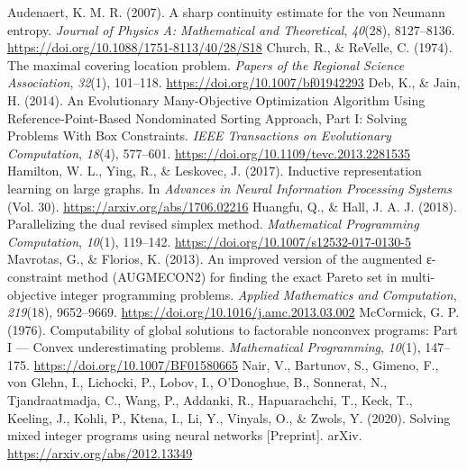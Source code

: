 \documentclass[10pt]{article}
\begin{document}
\begin{thebibliography}{}
\setlength{\itemsep}{1pt}
Audenaert, K. M. R. (2007). A sharp continuity estimate for the von Neumann entropy. {\itshape Journal of Physics A: Mathematical and Theoretical}, {\itshape 40}(28), 8127–8136. \url{https://doi.org/10.1088/1751-8113/40/28/S18}
Church, R., \& ReVelle, C. (1974). The maximal covering location problem. {\itshape Papers of the Regional Science Association}, {\itshape 32}(1), 101–118. \url{https://doi.org/10.1007/bf01942293}
Deb, K., \& Jain, H. (2014). An Evolutionary Many-Objective Optimization Algorithm Using Reference-Point-Based Nondominated Sorting Approach, Part I: Solving Problems With Box Constraints. {\itshape IEEE Transactions on Evolutionary Computation}, {\itshape 18}(4), 577–601. \url{https://doi.org/10.1109/tevc.2013.2281535}
Hamilton, W. L., Ying, R., \& Leskovec, J. (2017). Inductive representation learning on large graphs. In {\itshape Advances in Neural Information Processing Systems} (Vol. 30). \url{https://arxiv.org/abs/1706.02216}
Huangfu, Q., \& Hall, J. A. J. (2018). Parallelizing the dual revised simplex method. {\itshape Mathematical Programming Computation}, {\itshape 10}(1), 119–142. \url{https://doi.org/10.1007/s12532-017-0130-5}
Mavrotas, G., \& Florios, K. (2013). An improved version of the augmented ε-constraint method (AUGMECON2) for finding the exact Pareto set in multi-objective integer programming problems. {\itshape Applied Mathematics and Computation}, {\itshape 219}(18), 9652–9669. \url{https://doi.org/10.1016/j.amc.2013.03.002}
McCormick, G. P. (1976). Computability of global solutions to factorable nonconvex programs: Part I --- Convex underestimating problems. {\itshape Mathematical Programming}, {\itshape 10}(1), 147–175. \url{https://doi.org/10.1007/BF01580665}
Nair, V., Bartunov, S., Gimeno, F., von Glehn, I., Lichocki, P., Lobov, I., O'Donoghue, B., Sonnerat, N., Tjandraatmadja, C., Wang, P., Addanki, R., Hapuarachchi, T., Keck, T., Keeling, J., Kohli, P., Ktena, I., Li, Y., Vinyals, O., \& Zwols, Y. (2020). Solving mixed integer programs using neural networks [Preprint]. arXiv. \url{https://arxiv.org/abs/2012.13349}

\end{thebibliography}
\end{document}
